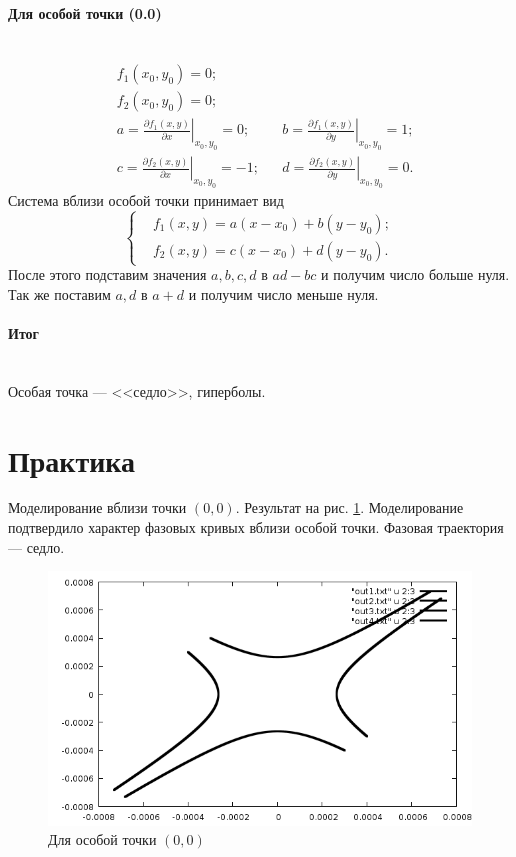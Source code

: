 \documentclass[14pt]{extarticle}
\begin{document}
\paragraph{Для особой точки (0.0)}$\quad$\\
\begin{equation}
  \begin{aligned}
    &f_1(x_0,y_0)=0;\\
    &f_2(x_0,y_0)=0;\\
    &a = \left.\frac{\partial f_1(x,y)}{\partial x}\right|_{x_0,y_0} = 0; && b = \left.\frac{\partial f_1(x,y)}{\partial y}\right|_{x_0,y_0} = 1;\\
    &c = \left.\frac{\partial f_2(x,y)}{\partial x}\right|_{x_0,y_0} =-1; && d = \left.\frac{\partial f_2(x,y)}{\partial y}\right|_{x_0,y_0} = 0.
  \end{aligned}
\end{equation}
Система вблизи особой точки принимает вид
\begin{equation}
  \left\lbrace
  \begin{aligned}
    &f_1(x,y) = a(x-x_0)+b(y-y_0);\\
    &f_2(x,y) = c(x-x_0)+d(y-y_0).
  \end{aligned}
  \right.
\end{equation}
После этого подставим значения $a, b, c, d$ в $ad-bc$ и получим число больше нуля. Так же поставим $a, d$ в $a+d$ и получим число меньше нуля.
\paragraph{Итог}$\quad$\\
Особая точка --- <<седло>>, гиперболы.

\newpage
\section{Практика}

Моделирование вблизи точки $(0,0)$. Результат на рис. \ref{first}. Моделирование подтвердило характер фазовых кривых вблизи особой точки. Фазовая траектория --- седло.
\begin{figure}[!h]
  \centering
  \includegraphics[width=1\textwidth]{all.png}
  \caption{Для особой точки $(0,0)$\label{first}}
\end{figure}
\end{document}
